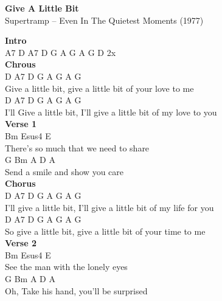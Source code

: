 \documentclass[a4paper]{article}
\begin{document}
    \begin{center}
        \textbf{Give A Little Bit}
        ~\\
        Supertramp -- Even In The Quietest Moments (1977)
    \end{center}
    {
        \scriptsize
        \textbf{Intro}
        ~\\
        {
            \cutive
            \obeyspaces
A7 D  A7 D  G A  G A  G D 2x
\\

        }
        \textbf{Chrous}
        ~\\
        {
            \cutive
            \obeyspaces
D                A7 D                 G       A        G A  G
\\
Give a little bit,  give a little bit of your love to me
\\
D                      A7 D                      G     A         G A  G
\\
I'll Give a little bit,   I'll give a little bit of my love to you
\\

        }
        \textbf{Verse 1}
        ~\\
        {
            \cutive
            \obeyspaces
Bm                      Esus4   E
\\
There's so much that we need to share
\\
G                Bm       A   D A
\\
Send a smile and show you care
\\

        }
        \textbf{Chorus}
        ~\\
        {
            \cutive
            \obeyspaces
D                     A7 D                      G     A          G A  G
\\
I'll give a little bit,  I'll give a little bit of my life for you
\\
D                   A7 D                 G       A        G A  G
\\
So give a little bit,  give a little bit of your time to me
\\

        }
        \textbf{Verse 2}
        ~\\
        {
            \cutive
            \obeyspaces
Bm                   Esus4  E
\\
See the man with the lonely eyes
\\
    G                     Bm    A     D A
\\
Oh, Take his hand, you'll be surprised
\\

}}
\end{document}
